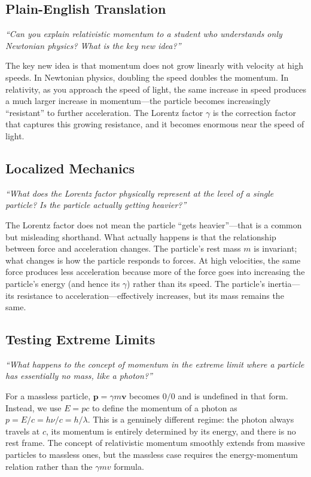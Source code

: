 \subsection*{Plain-English Translation}
\textit{``Can you explain relativistic momentum to a student who understands only Newtonian physics? What is the key new idea?''}

The key new idea is that momentum does not grow linearly with velocity at high speeds. In Newtonian physics, doubling the speed doubles the momentum. In relativity, as you approach the speed of light, the same increase in speed produces a much larger increase in momentum---the particle becomes increasingly ``resistant'' to further acceleration. The Lorentz factor $\gamma$ is the correction factor that captures this growing resistance, and it becomes enormous near the speed of light.

\subsection*{Localized Mechanics}
\textit{``What does the Lorentz factor physically represent at the level of a single particle? Is the particle actually getting heavier?''}

The Lorentz factor does not mean the particle ``gets heavier''---that is a common but misleading shorthand. What actually happens is that the relationship between force and acceleration changes. The particle's rest mass $m$ is invariant; what changes is how the particle responds to forces. At high velocities, the same force produces less acceleration because more of the force goes into increasing the particle's energy (and hence its $\gamma$) rather than its speed. The particle's inertia---its resistance to acceleration---effectively increases, but its mass remains the same.

\subsection*{Testing Extreme Limits}
\textit{``What happens to the concept of momentum in the extreme limit where a particle has essentially no mass, like a photon?''}

For a massless particle, $\mathbf{p} = \gamma m \mathbf{v}$ becomes $0/0$ and is undefined in that form. Instead, we use $E = pc$ to define the momentum of a photon as $p = E/c = h\nu/c = h/\lambda$. This is a genuinely different regime: the photon always travels at $c$, its momentum is entirely determined by its energy, and there is no rest frame. The concept of relativistic momentum smoothly extends from massive particles to massless ones, but the massless case requires the energy-momentum relation rather than the $\gamma m v$ formula.

